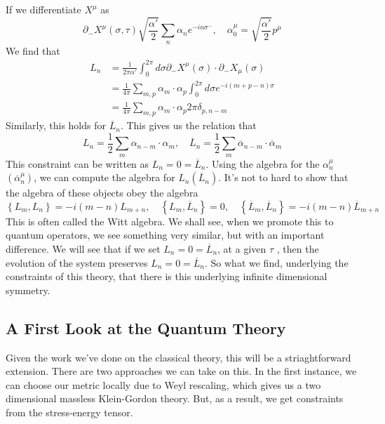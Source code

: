 \documentclass[11pt, oneside]{article}   	%
\theoremstyle{slanted}
\begin{document}
If we differentiate $ X ^ \mu $ as 
\[
	\partial  _ - X ^ \mu \left( \sigma , \tau  \right)    
	\sqrt{ \frac{ \alpha  ' }{ 2 }  }  \sum _{ n } \alpha _ n e ^{  - i n \sigma ^{  -}  } , \quad \alpha _ 0 ^{ \mu }  = \sqrt{ \frac{ \alpha '  }{ 2 } }  p ^ \mu 
\] We find 
that 
\begin{align*}
	L_ n  &=  \frac{1}{2 \pi \alpha  ' } \int _ 0 ^{ 2 \pi } 
	d \sigma \partial  _ - X ^ \mu \left( \sigma  \right)  \cdot  \partial  _  - 
	X _ \mu \left( \sigma  \right)  \\ 
	&=  \frac{1}{4 \pi } \sum _{ m , p } \alpha _ m \cdot  \alpha _ p \int 
	_ 0 ^{ 2 \pi } d \sigma e ^{  - i \left( m + p - n  \right)  \sigma } \\
	&=  \frac{1}{ 4 \pi } \sum _{ m , p } \alpha_ m \cdot  \alpha _ p 
	2 \pi \delta _{ p , n  -m } 
\end{align*}
Similarly, this 
holds for $ \overline{ L } _ n $. 
This gives us the 
relation that 
\[
 L _ n  = \frac{1}{2 } \sum _ m \alpha _{ n  - m } \cdot   \alpha _ m , 
 \quad \overline{ L } _ n  = \frac{1}{2 } \sum _ m \overline{ \alpha } _{ n - m } \cdot  
 \overline{ \alpha } _m 
\]  This constraint can be written 
as $ L _ n  = 0  = \overline{ L } _ n $. 
Using the algebra for the $ \alpha _ n ^ \mu $ $ \left( \overline{ \alpha } _ n ^ \mu  \right)  $, we can compute the algebra for $ L _ n \left( \overline{ L } _ n  \right)  $. 
It's 
not to hard to show that the algebra 
of these objects obey 
the algebra 
\[
 \left\{  L _ m , L _ n  \right\}   = - i 
 \left( m - n  \right)  L _{ m + n }, \quad 
 \left\{  L _ m , \overline{ L } _ n  \right\}   = 0 , 
 \quad \left\{  \overline{ L } _ m , \overline{ L } _ n  \right\}   = - i \left( m - n  \right)  \overline{ L } _{ m + n }
\] 
This is often called the Witt algebra. 
We shall see, when we promote this 
to quantum operators, 
we see something very similar, but with an important difference. 
We will see that if we set $ L _ n  = 0  = \overline{ L } _n $, 
at a given  $ \tau $ , then 
the evolution of the system 
preserves $ L _ n   = 0  = \overline{ L } _ n $. 
So what we find, underlying the constraints of 
this theory, that there is this underlying 
infinite dimensional symmetry. 

\subsection{A First Look at the Quantum Theory}
Given the work we've done
on the classical theory, 
this will be a striaghtforward extension. 
There are two approaches we can take on this. 
In the first instance, we can choose 
our metric locally due to Weyl rescaling, 
which gives us a two dimensional massless Klein-Gordon theory. 
But, as a result, we 
get constraints from the stress-energy tensor. 
\end{document}
